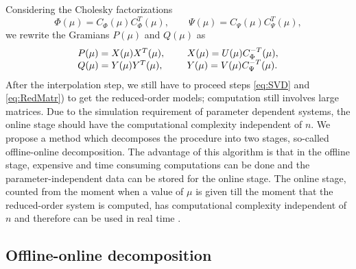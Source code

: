Considering the Cholesky factorizations 
\begin{equation}
\Phi(\mu)=C_{\Phi}^{}(\mu)C_{\Phi}^T(\mu), \qquad
\Psi(\mu)=C_{\Psi}^{}(\mu)C_{\Psi}^T(\mu),
\label{eq:Chol}
\end{equation}
we rewrite the Gramians $P(\mu)$ and $Q(\mu)$ as 
\begin{equation}
\arraycolsep=2pt
\begin{array}{ll}
P(\mu)=X(\mu)X^T(\mu), & \qquad X(\mu) =U(\mu)C_{\Phi}^{-T}(\mu),\\
Q(\mu)=Y(\mu)Y^T(\mu), & \qquad Y(\mu) =V(\mu)C_{\Psi}^{-T}(\mu).
\end{array}
\label{eq:PQmu}
\end{equation}
After the interpolation step, we still have to proceed steps \eqref{eq:SVD} and \eqref{eq:RedMatr}) to get the reduced-order models; computation still involves large matrices. Due to the simulation requirement of parameter dependent systems, the online stage should have the computational complexity independent of $n$. We propose a method which decomposes the procedure into two stages, so-called offline-online decomposition. The advantage of this algorithm is that in the offline stage, expensive and time consuming computations can be done and the parameter-independent data can be stored for the online stage. The online stage, counted from the moment when a value of $\mu$ is given till the moment that the reduced-order system is computed, has computational complexity independent of $n$ and therefore can be used in real time \cite{Son13}. 

\subsection{Offline-online decomposition}

